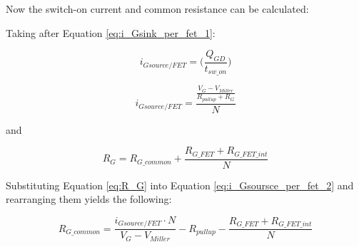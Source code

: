     Now the switch-on current and common resistance can be calculated:
    
    Taking after Equation \ref{eq:i_Gsink_per_fet_1}:

    \begin{equation}
        i_{Gsource/FET} = \bigg( \frac{Q_{GD}}{t_{sw{\_}on}} \bigg)
        \label{eq:i_Gsource_per_fet_1}
    \end{equation}    
    
    
    
    \begin{equation}
        i_{Gsource/FET} = \frac{\frac{V_G - V_{Miller}}{R_{pullup} + R_G}}{N}
        \label{eq:i_Gsoursce_per_fet_2}
    \end{equation}
    
    and
    
    \begin{equation}
        R_G = R_{G{\_}common} + \frac{R_{G{\_}FET} + R_{G{\_}FET{\_}int}}{N}
        \label{eq:R_G}
    \end{equation}
    
    Substituting Equation \ref{eq:R_G} into Equation \ref{eq:i_Gsoursce_per_fet_2} and rearranging them yields the following:
    
    \begin{equation}
        R_{G{\_}common} = \frac{i_{Gsource/FET} \cdot N}{V_G - V_{Miller}} - R_{pullup} - \frac{R_{G{\_}FET} + R_{G{\_}FET{\_}int}}{N}
        \label{eq:R_G_common}
    \end{equation}